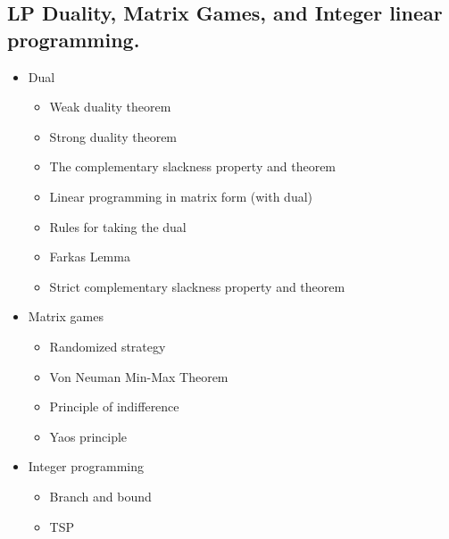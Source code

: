 \documentclass[11pt]{article}
\begin{document}
\subsection{LP Duality, Matrix Games, and Integer linear programming.}
\label{sec:orgb88316c}
\begin{itemize}
\item Dual
\begin{itemize}
\item Weak duality theorem
\item Strong duality theorem
\item The complementary slackness property and theorem
\item Linear programming in matrix form (with dual)
\item Rules for taking the dual
\item Farkas Lemma
\item Strict complementary slackness property and theorem
\end{itemize}

\item Matrix games
\begin{itemize}
\item Randomized strategy
\item Von Neuman Min-Max Theorem
\item Principle of indifference
\item Yaos principle
\end{itemize}

\item Integer programming
\begin{itemize}
\item Branch and bound
\item TSP
\end{itemize}
\end{itemize}
\end{document}
